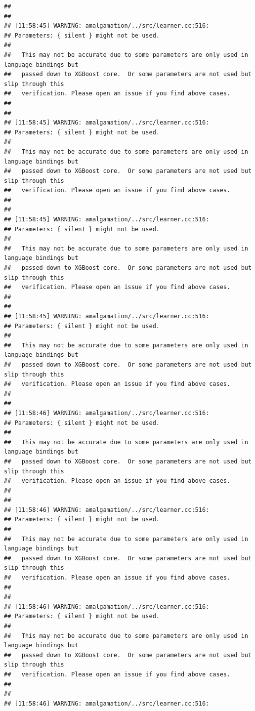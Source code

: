 \documentclass[AMS,STIX2COL]{WileyNJD-v2}\usepackage[]{graphicx}\usepackage[]{color}
\makeatletter
\newenvironment{kframe}{%
 \def\at@end@of@kframe{}%
 \ifinner\ifhmode%
  \def\at@end@of@kframe{\end{minipage}}%
  \begin{minipage}{\columnwidth}%
 \fi\fi%
 \def\FrameCommand##1{\hskip\@totalleftmargin \hskip-\fboxsep
 \colorbox{shadecolor}{##1}\hskip-\fboxsep
     \hskip-\linewidth \hskip-\@totalleftmargin \hskip\columnwidth}%
 \MakeFramed {\advance\hsize-\width
   \@totalleftmargin\z@ \linewidth\hsize
   \@setminipage}}%
 {\par\unskip\endMakeFramed%
 \at@end@of@kframe}
\newenvironment{knitrout}{}{} %
\makeatother
\begin{document}
\begin{knitrout}
\begin{kframe}
\begin{verbatim}
## 
## 
## [11:58:45] WARNING: amalgamation/../src/learner.cc:516: 
## Parameters: { silent } might not be used.
## 
##   This may not be accurate due to some parameters are only used in language bindings but
##   passed down to XGBoost core.  Or some parameters are not used but slip through this
##   verification. Please open an issue if you find above cases.
## 
## 
## [11:58:45] WARNING: amalgamation/../src/learner.cc:516: 
## Parameters: { silent } might not be used.
## 
##   This may not be accurate due to some parameters are only used in language bindings but
##   passed down to XGBoost core.  Or some parameters are not used but slip through this
##   verification. Please open an issue if you find above cases.
## 
## 
## [11:58:45] WARNING: amalgamation/../src/learner.cc:516: 
## Parameters: { silent } might not be used.
## 
##   This may not be accurate due to some parameters are only used in language bindings but
##   passed down to XGBoost core.  Or some parameters are not used but slip through this
##   verification. Please open an issue if you find above cases.
## 
## 
## [11:58:45] WARNING: amalgamation/../src/learner.cc:516: 
## Parameters: { silent } might not be used.
## 
##   This may not be accurate due to some parameters are only used in language bindings but
##   passed down to XGBoost core.  Or some parameters are not used but slip through this
##   verification. Please open an issue if you find above cases.
## 
## 
## [11:58:46] WARNING: amalgamation/../src/learner.cc:516: 
## Parameters: { silent } might not be used.
## 
##   This may not be accurate due to some parameters are only used in language bindings but
##   passed down to XGBoost core.  Or some parameters are not used but slip through this
##   verification. Please open an issue if you find above cases.
## 
## 
## [11:58:46] WARNING: amalgamation/../src/learner.cc:516: 
## Parameters: { silent } might not be used.
## 
##   This may not be accurate due to some parameters are only used in language bindings but
##   passed down to XGBoost core.  Or some parameters are not used but slip through this
##   verification. Please open an issue if you find above cases.
## 
## 
## [11:58:46] WARNING: amalgamation/../src/learner.cc:516: 
## Parameters: { silent } might not be used.
## 
##   This may not be accurate due to some parameters are only used in language bindings but
##   passed down to XGBoost core.  Or some parameters are not used but slip through this
##   verification. Please open an issue if you find above cases.
## 
## 
## [11:58:46] WARNING: amalgamation/../src/learner.cc:516: 

\end{verbatim}
\end{kframe}
\end{knitrout}
\end{document}
